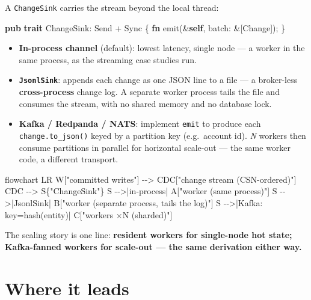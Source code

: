 \documentclass[
  11pt,
  openany]{book}
\newenvironment{Shaded}{}{}
\newcommand{\BuiltInTok}[1]{\textcolor[rgb]{0.00,0.50,0.00}{#1}}
\newcommand{\KeywordTok}[1]{\textcolor[rgb]{0.00,0.44,0.13}{\textbf{#1}}}
\newcommand{\NormalTok}[1]{#1}
\newcommand{\OperatorTok}[1]{\textcolor[rgb]{0.40,0.40,0.40}{#1}}
\providecommand{\tightlist}{%
  \setlength{\itemsep}{0pt}\setlength{\parskip}{0pt}}
\begin{document}
A \texttt{ChangeSink} carries the stream beyond the local thread:

\begin{Shaded}
\begin{Highlighting}[]
\KeywordTok{pub} \KeywordTok{trait}\NormalTok{ ChangeSink}\OperatorTok{:} \BuiltInTok{Send} \OperatorTok{+} \BuiltInTok{Sync} \OperatorTok{\{} \KeywordTok{fn}\NormalTok{ emit(}\OperatorTok{\&}\KeywordTok{self}\OperatorTok{,}\NormalTok{ batch}\OperatorTok{:} \OperatorTok{\&}\NormalTok{[Change])}\OperatorTok{;} \OperatorTok{\}}
\end{Highlighting}
\end{Shaded}

\begin{itemize}
\tightlist
\item
  \textbf{In-process channel} (default): lowest latency, single node ---
  a worker in the same process, as the streaming case studies run.
\item
  \textbf{\texttt{JsonlSink}}: appends each change as one JSON line to a
  file --- a broker-less \textbf{cross-process} change log. A separate
  worker process tails the file and consumes the stream, with no shared
  memory and no database lock.
\item
  \textbf{Kafka / Redpanda / NATS}: implement \texttt{emit} to produce
  each \texttt{change.to\_json()} keyed by a partition key (e.g.~account
  id). \emph{N} workers then consume partitions in parallel for
  horizontal scale-out --- the same worker code, a different transport.
\end{itemize}

\begin{Shaded}
\begin{Highlighting}[]
\NormalTok{flowchart LR}
\NormalTok{    W["committed writes"] {-}{-}\textgreater{} CDC["change stream (CSN{-}ordered)"]}
\NormalTok{    CDC {-}{-}\textgreater{} S\{"ChangeSink"\}}
\NormalTok{    S {-}{-}\textgreater{}|in{-}process| A["worker (same process)"]}
\NormalTok{    S {-}{-}\textgreater{}|JsonlSink| B["worker (separate process, tails the log)"]}
\NormalTok{    S {-}{-}\textgreater{}|Kafka: key=hash(entity)| C["workers ×N (sharded)"]}
\end{Highlighting}
\end{Shaded}

The scaling story is one line: \textbf{resident workers for single-node
hot state; Kafka-fanned workers for scale-out --- the same derivation
either way.}

\section{Where it leads}\label{where-it-leads}
\end{document}
